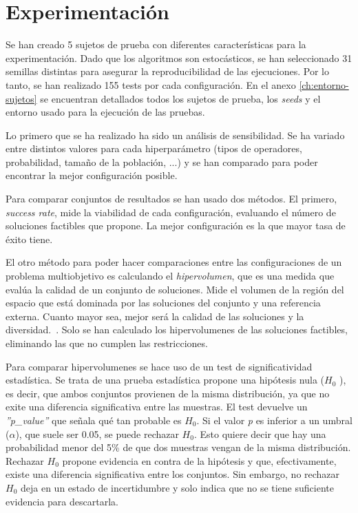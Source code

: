\chapter{Experimentación}
\label{ch:experimentacion}

Se han creado 5 sujetos de prueba con diferentes características para la experimentación. Dado que los algoritmos son estocásticos, se han seleccionado 31 semillas distintas para asegurar la reproducibilidad de las ejecuciones. Por lo tanto, se han realizado 155 tests por cada configuración. En el anexo \ref{ch:entorno-sujetos} se encuentran detallados todos los sujetos de prueba, los \textit{seeds} y el entorno usado para la ejecución de las pruebas.

Lo primero que se ha realizado ha sido un análisis de sensibilidad. Se ha variado entre distintos valores para cada hiperparámetro (tipos de operadores, probabilidad, tamaño de la población, ...) y se han comparado para poder encontrar la mejor configuración posible.

Para comparar conjuntos de resultados se han usado dos métodos. El primero, \textit{success rate}, mide la viabilidad de cada configuración, evaluando el número de soluciones factibles que propone. La mejor configuración es la que mayor tasa de éxito tiene.

El otro método para poder hacer comparaciones entre las configuraciones de un problema multiobjetivo es calculando el \textit{hipervolumen}, que es una medida que evalúa la calidad de un conjunto de soluciones. Mide el volumen de la región del espacio que está dominada por las soluciones del conjunto y una referencia externa. Cuanto mayor sea, mejor será la calidad de las soluciones y la diversidad.~\cite{pymoo2024hypervolume}. Solo se han calculado los hipervolumenes de las soluciones factibles, eliminando las que no cumplen las restricciones.

Para comparar hipervolumenes se hace uso de un test de significatividad estadística. Se trata de una prueba estadística propone una hipótesis nula (\(H_0\) ), es decir, que ambos conjuntos provienen de la misma distribución, ya que no exite una diferencia significativa entre las muestras. El test devuelve un \textit{''p\_value''} que señala qué tan probable es \(H_0\). Si el valor \textit{p} es inferior a un umbral ($\alpha$), que suele ser 0.05, se puede rechazar \(H_0\). Esto quiere decir que hay una probabilidad menor del 5\% de que dos muestras vengan de la misma distribución.
\newpage
Rechazar \(H_0\) propone evidencia en contra de la hipótesis y que, efectivamente, existe una diferencia significativa entre los conjuntos. Sin embargo, no rechazar \(H_0\) deja en un estado de incertidumbre y solo indica que no se tiene suficiente evidencia para descartarla.

